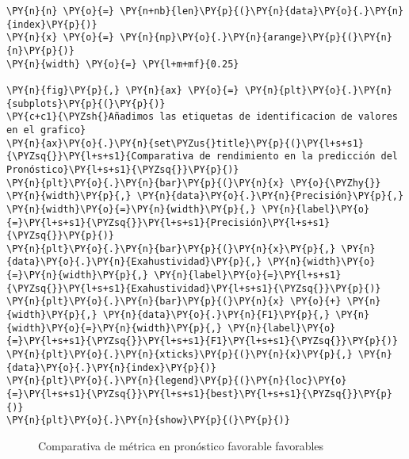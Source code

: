     \begin{tcolorbox}[breakable, size=fbox, boxrule=1pt, pad at break*=1mm,colback=cellbackground, colframe=cellborder]
\begin{Verbatim}[commandchars=\\\{\}]
\PY{n}{n} \PY{o}{=} \PY{n+nb}{len}\PY{p}{(}\PY{n}{data}\PY{o}{.}\PY{n}{index}\PY{p}{)}
\PY{n}{x} \PY{o}{=} \PY{n}{np}\PY{o}{.}\PY{n}{arange}\PY{p}{(}\PY{n}{n}\PY{p}{)}
\PY{n}{width} \PY{o}{=} \PY{l+m+mf}{0.25}

\PY{n}{fig}\PY{p}{,} \PY{n}{ax} \PY{o}{=} \PY{n}{plt}\PY{o}{.}\PY{n}{subplots}\PY{p}{(}\PY{p}{)}
\PY{c+c1}{\PYZsh{}Añadimos las etiquetas de identificacion de valores en el grafico}
\PY{n}{ax}\PY{o}{.}\PY{n}{set\PYZus{}title}\PY{p}{(}\PY{l+s+s1}{\PYZsq{}}\PY{l+s+s1}{Comparativa de rendimiento en la predicción del Pronóstico}\PY{l+s+s1}{\PYZsq{}}\PY{p}{)}
\PY{n}{plt}\PY{o}{.}\PY{n}{bar}\PY{p}{(}\PY{n}{x} \PY{o}{\PYZhy{}} \PY{n}{width}\PY{p}{,} \PY{n}{data}\PY{o}{.}\PY{n}{Precisión}\PY{p}{,} \PY{n}{width}\PY{o}{=}\PY{n}{width}\PY{p}{,} \PY{n}{label}\PY{o}{=}\PY{l+s+s1}{\PYZsq{}}\PY{l+s+s1}{Precisión}\PY{l+s+s1}{\PYZsq{}}\PY{p}{)}
\PY{n}{plt}\PY{o}{.}\PY{n}{bar}\PY{p}{(}\PY{n}{x}\PY{p}{,} \PY{n}{data}\PY{o}{.}\PY{n}{Exahustividad}\PY{p}{,} \PY{n}{width}\PY{o}{=}\PY{n}{width}\PY{p}{,} \PY{n}{label}\PY{o}{=}\PY{l+s+s1}{\PYZsq{}}\PY{l+s+s1}{Exahustividad}\PY{l+s+s1}{\PYZsq{}}\PY{p}{)}
\PY{n}{plt}\PY{o}{.}\PY{n}{bar}\PY{p}{(}\PY{n}{x} \PY{o}{+} \PY{n}{width}\PY{p}{,} \PY{n}{data}\PY{o}{.}\PY{n}{F1}\PY{p}{,} \PY{n}{width}\PY{o}{=}\PY{n}{width}\PY{p}{,} \PY{n}{label}\PY{o}{=}\PY{l+s+s1}{\PYZsq{}}\PY{l+s+s1}{F1}\PY{l+s+s1}{\PYZsq{}}\PY{p}{)}
\PY{n}{plt}\PY{o}{.}\PY{n}{xticks}\PY{p}{(}\PY{n}{x}\PY{p}{,} \PY{n}{data}\PY{o}{.}\PY{n}{index}\PY{p}{)}
\PY{n}{plt}\PY{o}{.}\PY{n}{legend}\PY{p}{(}\PY{n}{loc}\PY{o}{=}\PY{l+s+s1}{\PYZsq{}}\PY{l+s+s1}{best}\PY{l+s+s1}{\PYZsq{}}\PY{p}{)}
\PY{n}{plt}\PY{o}{.}\PY{n}{show}\PY{p}{(}\PY{p}{)}
\end{Verbatim}
\end{tcolorbox}

\begin{center}
    	\begin{figure}[H]
	\centering
	\caption{Comparativa de métrica en pronóstico favorable favorables}
	\label{fig:cmpf}
	\end{figure}
\end{center}
    
